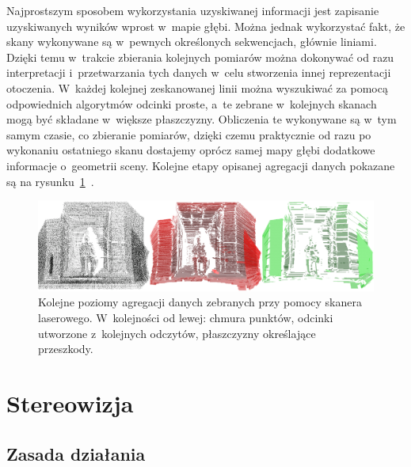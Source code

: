 Najprostszym sposobem wykorzystania uzyskiwanej informacji jest zapisanie
uzyskiwanych wyników wprost w~mapie głębi. Można jednak wykorzystać fakt, że
skany wykonywane są w~pewnych określonych sekwencjach, głównie liniami. Dzięki
temu w~trakcie zbierania kolejnych pomiarów można dokonywać od razu
interpretacji i~przetwarzania tych danych w~celu stworzenia innej reprezentacji
otoczenia. W~każdej kolejnej zeskanowanej linii można wyszukiwać za pomocą
odpowiednich algorytmów odcinki proste, a~te zebrane w~kolejnych skanach mogą
być składane w~większe płaszczyzny. Obliczenia te wykonywane są w~tym samym
czasie, co zbieranie pomiarów, dzięki czemu praktycznie od razu po wykonaniu
ostatniego skanu dostajemy oprócz samej mapy głębi dodatkowe informacje 
o~geometrii sceny. Kolejne etapy opisanej agregacji danych
pokazane są na rysunku~\ref{fig:laser_aggregate}~\cite{Surmann01a3d}.

\begin{figure}[h!]
\centering
\includegraphics[width=12cm]{../../Common/img/laser_aggregate}
\caption{Kolejne poziomy agregacji danych zebranych przy pomocy skanera
laserowego. W~kolejności od lewej: chmura punktów, odcinki utworzone z~kolejnych
odczytów, płaszczyzny określające przeszkody.}
\label{fig:laser_aggregate}
\end{figure}

\section{Stereowizja}

\subsection{Zasada działania}

